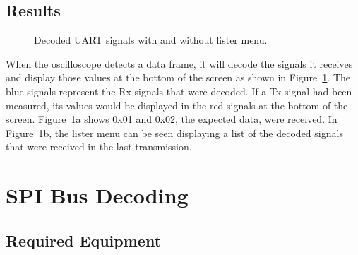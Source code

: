 \documentclass{article}
\begin{document}

  \subsection{Results}

  \begin{figure}[ht]
    \caption{Decoded UART signals with and without lister menu.}
    \label{fig:uart_bus}
  \end{figure}

  When the oscilloscope detects a data frame, it will decode the signals it
  receives and display those values at the bottom of the screen as shown in
  Figure~\ref{fig:uart_bus}. The blue signals represent the Rx signals that were
  decoded. If a Tx signal had been measured, its values would be displayed in
  the red signals at the bottom of the screen. Figure~\ref{fig:uart_bus}a shows
  0x01 and 0x02, the expected data, were received. In
  Figure~\ref{fig:uart_bus}b, the lister menu can be seen displaying a list of
  the decoded signals that were received in the last transmission.

  \section{SPI Bus Decoding}

  \subsection{Required Equipment}
\end{document}
